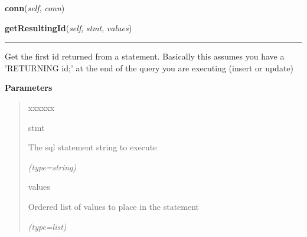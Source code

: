     \label{src:dao:base_dao:BaseDAO:conn}

    \vspace{0.5ex}

\hspace{.8\funcindent}\begin{boxedminipage}{\funcwidth}

    \raggedright \textbf{conn}(\textit{self}, \textit{conn})

\setlength{\parskip}{2ex}
\setlength{\parskip}{1ex}
    \end{boxedminipage}

    \label{src:dao:base_dao:BaseDAO:getResultingId}

    \vspace{0.5ex}

\hspace{.8\funcindent}\begin{boxedminipage}{\funcwidth}

    \raggedright \textbf{getResultingId}(\textit{self}, \textit{stmt}, \textit{values})

    \vspace{-1.5ex}

    \rule{\textwidth}{0.5\fboxrule}
\setlength{\parskip}{2ex}
    Get the first id returned from a statement. Basically this assumes you 
    have a 'RETURNING id;' at the end of the query you are executing 
    (insert or update)

\setlength{\parskip}{1ex}
      \textbf{Parameters}
      \vspace{-1ex}

      \begin{quote}
        \begin{Ventry}{xxxxxx}

          \item[stmt]

          The sql statement string to execute

            {\it (type=string)}

          \item[values]

          Ordered list of values to place in the statement

            {\it (type=list)}

        \end{Ventry}

      \end{quote}

    \end{boxedminipage}

